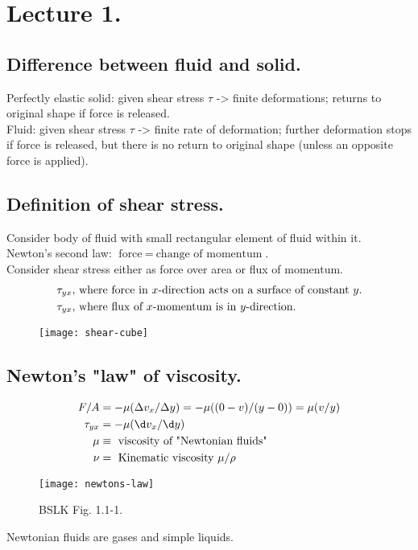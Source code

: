 \section{Lecture 1.}
\subsection{Difference between fluid and solid.}
Perfectly elastic solid: given shear stress $ \tau $ -> finite deformations; returns to original shape if force is released.\\
Fluid: given shear stress $ \tau $ -> finite rate of deformation; further deformation stops if force is released, but there is no return to original shape (unless an opposite force is applied).

\subsection{Definition of shear stress.}
Consider body of fluid with small rectangular element of fluid within it.\\
Newton's second law: $ \text{force} \ = \ \text{change of momentum} $.\\
Consider shear stress either as force over area or flux of momentum.
\begin{align*}
	\tau_{yx}, & \ \text{where force in $ x $-direction acts on a surface of constant $ y $.} \\
	\tau_{yx}, & \ \text{where flux of $ x $-momentum is in $ y $-direction.}
\end{align*}
\begin{figure}[H]
	\centering
	\texttt{[image: shear-cube]}
\end{figure}

\subsection{Newton's "law" of viscosity.}
\begin{align*}
	F/A       & = -\mu(\Delta v_x / \Delta y) = -\mu((0-v)/(y-0)) = \mu(v/y) \\
	\tau_{yx} & = -\mu(\d v_x/\d y)                                          \\
	\mu       & \equiv \ \text{viscosity of "Newtonian fluids"}              \\
	\nu       & = \ \text{Kinematic viscosity} \ \mu/\rho
\end{align*}
\begin{figure}[H]
	\centering
	\texttt{[image: newtons-law]}
	\caption{BSLK Fig. 1.1-1.}
\end{figure}
Newtonian fluids are gases and simple liquids.

